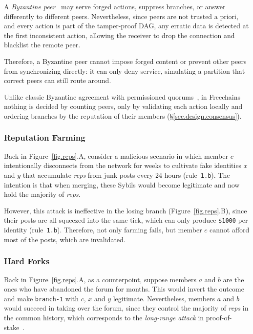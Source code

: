 \documentclass[10pt,twocolumn]{article}
\newcommand{\FC}       {Freechains\xspace}
\newcommand{\R}[1]     {rule~\code{#1}\xspace}
\newcommand{\reps}     {\emph{reps}\xspace}
\newcommand{\nreps}[1] {\code{\$#1\xspace}}
\newcommand{\code}[1]  {\texttt{\small{#1}}}
\begin{document}
A \emph{Byzantine peer}~\cite{lamport.byz} may serve forged actions, suppress
branches, or answer differently to different peers.
%
Nevertheless, since peers are not trusted a priori, and every action is part of
the tamper-proof DAG, any erratic data is detected at the first inconsistent
action,
allowing the receiver to drop the connection and blacklist the remote peer.

Therefore, a Byzantine peer cannot impose forged content or prevent other peers
from synchronizing directly: it can only deny service, simulating a partition
that correct peers can still route around.

Unlike classic Byzantine agreement with permissioned
quorums~\cite{lamport.byz,p2p.byz},
in \FC nothing is decided by counting peers, only by validating each action
locally and ordering branches by the reputation of their members
(\S\ref{sec.design.consensus}).

\subsubsection{Reputation Farming}
\label{sec.design.partitions.farming}

Back in Figure~\ref{fig.reps}.A, consider a malicious scenario in which member
$c$ intentionally disconnects from the network for weeks to cultivate fake
identities $x$ and $y$ that accumulate \reps from junk posts every 24 hours
(\R{1.b}).
%
The intention is that when merging, these Sybils would become legitimate and
now hold the majority of \reps.

However, this attack is ineffective in the losing branch
(Figure~\ref{fig.reps}.B), since their posts are all squeezed into the same
tick, which can only produce \nreps{1000} per identity (\R{1.b}).
Therefore, not only farming fails, but member $c$ cannot afford most of the
posts, which are invalidated.

\subsubsection{Hard Forks}
\label{sec.design.partitions.hardforks}

Back in Figure~\ref{fig.reps}.A, as a counterpoint, suppose members $a$ and $b$
are the ones who have abandoned the forum for months.
This would invert the outcome and make \code{branch-1} with $c$, $x$ and $y$
legitimate.
Nevertheless, members $a$ and $b$ would succeed in taking over the forum, since
they control the majority of \reps in the common history, which corresponds to
the \emph{long-range attack} in proof-of-stake~\cite{pos.weak}.
\end{document}
